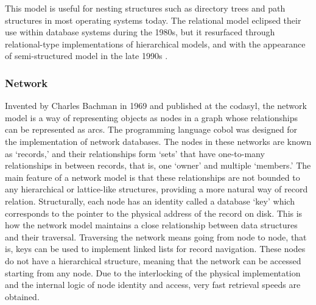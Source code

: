 This model is useful for nesting structures such as directory trees and path structures in most operating systems today. The relational model eclipsed their use within database systems during the 1980s, but it resurfaced through relational-type implementations of hierarchical models, and with the appearance of semi-structured model in the late 1990s .

\subsubsection{Network}
\label{model:network}


Invented by Charles Bachman in 1969 and published at the \gls{codasyl}, the network model is a way of representing objects as nodes in a graph whose relationships can be represented as arcs. The programming language \gls{cobol} was designed for the implementation of network databases. The nodes in these networks are known as `records,' and their relationships form `sets' that have one-to-many relationships in between records, that is, one `owner' and multiple `members.' The main feature of a network model is that these relationships are not bounded to any hierarchical or lattice-like structures, providing a more natural way of record relation. Structurally, each node has an identity called a database `key' which corresponds to the pointer to the physical address of the record on disk. This is how the network model maintains a close relationship between data structures and their traversal. Traversing the network means going from node to node, that is, keys can be used to implement linked lists for record navigation. These nodes do not have a hierarchical structure, meaning that the network can be accessed starting from any node. Due to the interlocking of the physical implementation and the internal logic of node identity and access, very fast retrieval speeds are obtained.

